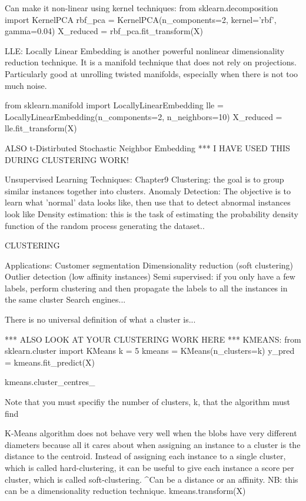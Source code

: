 Can make it non-linear using kernel techniques:
from sklearn.decomposition import KernelPCA
rbf_pca = KernelPCA(n_components=2, kernel='rbf', gamma=0.04)
X_reduced = rbf_pca.fit_transform(X)

LLE: Locally Linear Embedding
is another powerful nonlinear dimensionality reduction technique.
It is a manifold technique that does not rely on projections.
Particularly good at unrolling twisted manifolds, especially when there is not too much noise.

from sklearn.manifold import LocallyLinearEmbedding
lle = LocallyLinearEmbedding(n_components=2, n_neighbors=10)
X_reduced = lle.fit_transform(X)

ALSO t-Distirbuted Stochastic Neighbor Embedding
*** I HAVE USED THIS DURING CLUSTERING WORK!

Unsupervised Learning Techniques: Chapter9
Clustering: the goal is to group similar instances together into clusters.
Anomaly Detection: The objective is to learn what 'normal' data looks like,
then use that to detect abnormal instances look like
Density estimation: this is the task of estimating the probability density function of the random process generating the dataset..

CLUSTERING

Applications:
Customer segmentation
Dimensionality reduction (soft clustering)
Outlier detection (low affinity instances)
Semi supervised: if you only have a few labels, perform clustering and then propagate the labels to all the instances in the same cluster
Search engines...

There is no universal definition of what a cluster is...

*** ALSO LOOK AT YOUR CLUSTERING WORK HERE ***
KMEANS:
from sklearn.cluster import KMeans
k = 5
kmeans = KMeans(n_clusters=k)
y_pred = kmeans.fit_predict(X)

kmeans.cluster_centres_

Note that you must specifiy the number of clusters, k, that the algorithm must find

K-Means algorithm does not behave very well when the blobs have very different diameters because all it cares about
when assigning an instance to a cluster is the distance to the centroid.
Instead of assigning each instance to a single cluster, which is called hard-clustering,
it can be useful to give each instance a score per cluster, which is called soft-clustering.
^Can be a distance or an affinity. NB: this can be a dimensionality reduction technique.
kmeans.transform(X)

